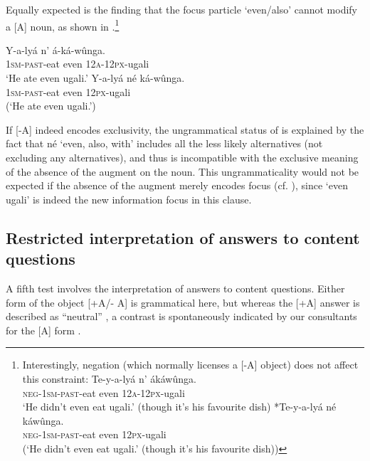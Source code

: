 \documentclass[output=paper]{langsci/langscibook}
\begin{document}
Equally expected is the finding that the focus particle ‘even/also’ cannot modify a [A] noun, as shown in .\footnote{%
  Interestingly, negation (which normally licenses a [-A] object) does not affect this constraint:
    \ea 
      \ea 
      \gll \textup{Te-y-a-lyá}    \textup{n’}  \textup{ákáwûnga.}\\
	\textsc{neg}-\textsc{1sm}-\textsc{past}-eat  even  \textsc{12a}-\textsc{12px}-ugali\\
      \glt   ‘He didn’t even eat ugali.’ (though it’s his favourite dish)
      \ex
      \gll \textup{*Te-y-a-lyá}    \textup{né}  \textup{káwûnga.}\\
	\textsc{neg}-\textsc{1sm}-\textsc{past}-eat  even  \textsc{12px}-ugali\\
\glt	(‘He didn’t even eat ugali.’ (though it’s his favourite dish))
      \z
    \z
}

\ea\label{ex:vanderwal:32}
\ea\label{ex:vanderwal:32a}
\gll     Y-a-lyá    n’  á-ká-wûnga.\\
         \textsc{1sm}-\textsc{past}-eat  even  \textsc{12a}-\textsc{12px}-ugali\\
\glt     ‘He ate even ugali.’
\ex\label{ex:vanderwal:32b}
\gll     *Y-a-lyá    né  ká-wûnga.\\
         \textsc{1sm}-\textsc{past}-eat  even  \textsc{12px}-ugali\\
\glt     (‘He ate even ugali.’)
\z
\z

If [-A] indeed encodes exclusivity, the ungrammatical status of  is explained by the fact that né ‘even, also, with’ includes all the less likely alternatives (not excluding any alternatives), and thus is incompatible with the exclusive meaning of the absence of the augment on the noun. This ungrammaticality would not be expected if the absence of the augment merely encodes focus (cf. \citealt{HymanKatamba1993}), since ‘even ugali’ is indeed the new information focus in this clause.

\subsection{Restricted interpretation of answers to content questions}\label{sec:vanderwal:4.5} %

A fifth test involves the interpretation of answers to content questions. Either form of the object [+A/- A] is grammatical here, but whereas the [+A] answer is described as “neutral” , a contrast is spontaneously indicated by our consultants for the [A] form . 
\end{document}
